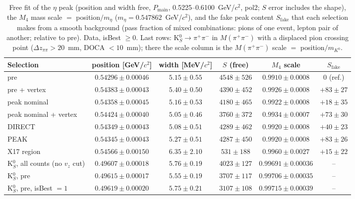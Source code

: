 \begin{table}[H]
\centering\footnotesize
\setlength{\tabcolsep}{3pt}
\caption{Free fit of the $\eta$ peak (position and width free, $P_\mathrm{main}$, 0.5225--0.6100~GeV/$c^2$, pol2; $S$ error includes the shape), the $M_4$ mass scale $=$ position$/m_\eta$ ($m_\eta=0.547862$~GeV/$c^2$), and the fake peak content $S_\mathrm{fake}$ that each selection makes from a smooth background (pass fraction of mixed combinations: pions of one event, lepton pair of another; relative to pre). Data, isBest $\geq0$. Last rows: K$^0_S\to\pi^+\pi^-$ in $M(\pi^+\pi^-)$ with a displaced pion crossing point ($\Delta z_{\pi\pi}>20$~mm, DOCA $<10$~mm); there the scale column is the $M(\pi^+\pi^-)$ scale $=$ position$/m_{K^0}$.}
\label{tab:res_scale}
\begin{tabular}{lccccc}
\toprule
Selection & position [GeV/$c^2$] & width [MeV/$c^2$] & $S$ (free) & $M_4$ scale & $S_\mathrm{fake}$ \\
\midrule
pre & $0.54296\pm0.00046$ & $5.15\pm0.55$ & $4548\pm526$ & $0.9910\pm0.0008$ & 0 (ref.) \\
pre + vertex & $0.54383\pm0.00043$ & $5.40\pm0.50$ & $4390\pm452$ & $0.9926\pm0.0008$ & $+83\pm27$ \\
peak nominal & $0.54358\pm0.00045$ & $5.16\pm0.53$ & $4180\pm465$ & $0.9922\pm0.0008$ & $+18\pm35$ \\
peak nominal + vertex & $0.54424\pm0.00040$ & $5.05\pm0.46$ & $3760\pm372$ & $0.9934\pm0.0007$ & $+73\pm30$ \\
DIRECT & $0.54349\pm0.00043$ & $5.08\pm0.51$ & $4289\pm462$ & $0.9920\pm0.0008$ & $+40\pm23$ \\
PEAK & $0.54345\pm0.00043$ & $5.27\pm0.51$ & $4287\pm450$ & $0.9920\pm0.0008$ & $+83\pm26$ \\
X17 region & $0.54566\pm0.00150$ & $6.35\pm2.10$ & $531\pm188$ & $0.9960\pm0.0027$ & $+15\pm22$ \\
\midrule
K$^0_S$, all counts (no $v_z$ cut) & $0.49607\pm0.00018$ & $5.76\pm0.19$ & $4023\pm127$ & $0.99691\pm0.00036$ & -- \\
K$^0_S$, pre & $0.49615\pm0.00017$ & $5.55\pm0.19$ & $3707\pm117$ & $0.99706\pm0.00035$ & -- \\
K$^0_S$, pre, isBest $=1$ & $0.49619\pm0.00020$ & $5.75\pm0.21$ & $3107\pm108$ & $0.99715\pm0.00039$ & -- \\
\bottomrule
\end{tabular}
\end{table}
